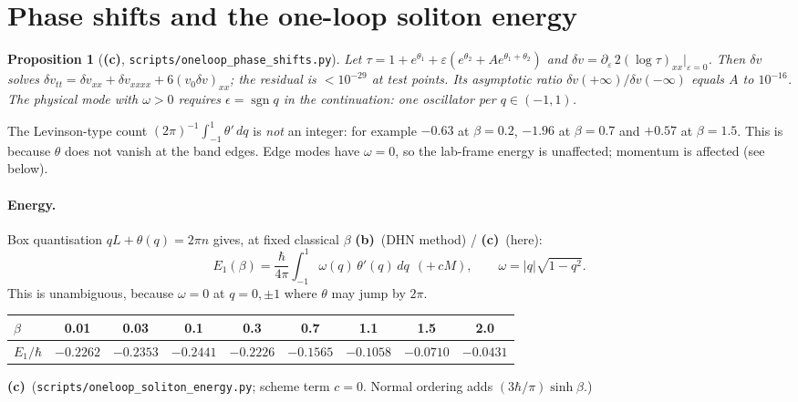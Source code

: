\documentclass[11pt,a4paper]{article}
\newcommand{\Lb}{\textsf{\textbf{(b)}}}
\newcommand{\Lc}{\textsf{\textbf{(c)}}}
\newcommand{\script}[1]{\texttt{scripts/#1}}
\newtheorem{proposition}{Proposition}[section]
\theoremstyle{remark}\newtheorem{remark}[proposition]{Remark}
\begin{document}
\section{Phase shifts and the one-loop soliton energy}
\begin{proposition}[\Lc, \script{oneloop\_phase\_shifts.py}]
Let $\tau=1+e^{\theta_1}+\varepsilon(e^{\theta_2}+Ae^{\theta_1+\theta_2})$ and $\delta v=\partial_\varepsilon\,2(\log\tau)_{xx}|_{\varepsilon=0}$. Then $\delta v$ solves $\delta v_{tt}=\delta v_{xx}+\delta v_{xxxx}+6(v_0\delta v)_{xx}$; the residual is $<10^{-29}$ at test points. Its asymptotic ratio $\delta v(+\infty)/\delta v(-\infty)$ equals $A$ to $10^{-16}$. The physical mode with $\omega>0$ requires $\epsilon=\operatorname{sgn}q$ in the continuation: one oscillator per $q\in(-1,1)$.
\end{proposition}

The Levinson-type count $(2\pi)^{-1}\int_{-1}^1\theta'\,dq$ is \emph{not} an integer: for example $-0.63$ at $\beta=0.2$, $-1.96$ at $\beta=0.7$ and $+0.57$ at $\beta=1.5$. This is because $\theta$ does not vanish at the band edges. Edge modes have $\omega=0$, so the lab-frame energy is unaffected; momentum is affected (see below).

\paragraph{Energy.} Box quantisation $qL+\theta(q)=2\pi n$ gives, at fixed classical $\beta$ \Lb\ (DHN method) / \Lc\ (here):
\begin{equation}\label{eq:E1}
E_1(\beta)=\frac{\hbar}{4\pi}\int_{-1}^{1}\omega(q)\,\theta'(q)\,dq\ \ (+\,cM),\qquad \omega=|q|\sqrt{1-q^2}.
\end{equation}
This is unambiguous, because $\omega=0$ at $q=0,\pm1$ where $\theta$ may jump by $2\pi$.

\begin{center}\small
\begin{tabular}{@{}lcccccccc@{}}\toprule
$\beta$ & 0.01 & 0.03 & 0.1 & 0.3 & 0.7 & 1.1 & 1.5 & 2.0\\\midrule
$E_1/\hbar$ & $-0.2262$ & $-0.2353$ & $-0.2441$ & $-0.2226$ & $-0.1565$ & $-0.1058$ & $-0.0710$ & $-0.0431$\\\bottomrule
\end{tabular}\end{center}
\Lc\ (\script{oneloop\_soliton\_energy.py}; scheme term $c=0$. Normal ordering adds $(3\hbar/\pi)\sinh\beta$.)
\end{document}
